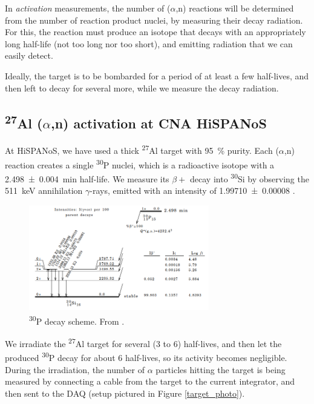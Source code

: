 \documentclass[a4paper,12pt]{report}
\newcommand{\an}{($\alpha$,n) }
\newcommand{\Aliso}{\textsuperscript{27}Al }
\newcommand{\Piso}{\textsuperscript{30}P }
\begin{document}
In \textit{activation} measurements, the number of \an reactions will be determined from the number of reaction product nuclei, by measuring their decay radiation.
For this, the reaction must produce an isotope that decays with an appropriately long half-life (not too long nor too short), and emitting radiation that we can easily detect.

Ideally, the target is to be bombarded for a period of at least a few half-lives, and then left to decay for several more, while we measure the decay radiation.

\subsection{\Aliso\an activation at CNA HiSPANoS}
At HiSPANoS, we have used a thick \Aliso target with \qty{95}{\percent} purity.
Each \an reaction creates a single \Piso nuclei, which is a radioactive isotope with a \qty{2.498(4)}{\minute} half-life.
We measure its $\beta +$ decay into \textsuperscript{30}Si by observing the \qty{511}{\keV} annihilation $\gamma$-rays, emitted with an intensity of \num{1.99710(8)} \cite{nucleardatasheets}.

\begin{figure}[H]
	\centering
	\includegraphics[width=0.7\textwidth]{Piso_decay_scheme.png}
	\caption{\Piso decay scheme.
	From \cite{nucleardatasheets}.}
	\label{Piso_decay_scheme}
\end{figure}

We irradiate the \Aliso target for several (3 to 6) half-lives, and then let the produced \Piso decay for about 6 half-lives, so its activity becomes negligible.
During the irradiation, the number of $\alpha$ particles hitting the target is being measured by connecting a cable from the target to the current integrator, and then sent to the DAQ (setup pictured in Figure \ref{target_photo}).
\end{document}
